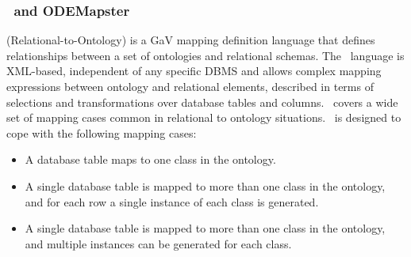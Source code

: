 \subsubsection{\rtwoo\ and ODEMapster}
\label{R2O}
\rtwoo(Relational-to-Ontology)\cite{Barrasa_04} is a GaV mapping definition language that defines relationships between a set of ontologies and relational schemas. The \rtwoo\ language is XML-based, independent of any specific DBMS and allows complex mapping expressions between ontology and relational elements, %
described in terms of selections and transformations over database tables and columns.
\rtwoo\ covers a wide set of mapping cases common in relational to ontology situations. \rtwoo\ is designed to cope
with the following mapping cases:
\begin{itemize}
\item A database table maps to one class in the ontology. %
\item A single database table is mapped to more than one class in the ontology, and for each row a single instance of each class is generated. %
\item A single database table is mapped to more than one class in the ontology, and multiple instances can be generated for each class. %
\end{itemize}

